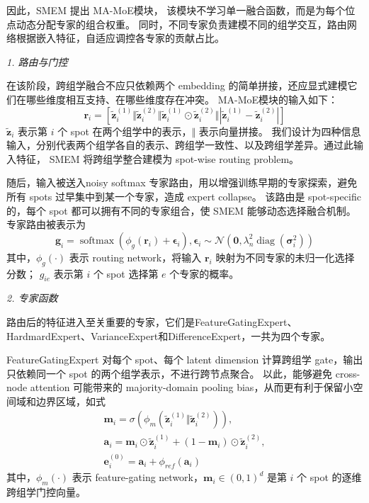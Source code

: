 \documentclass[journal]{IEEEtran}
\begin{document}
因此，SMEM 提出 MA-MoE模块，
该模块不学习单一融合函数，而是为每个位点动态分配专家的组合权重。
同时，不同专家负责建模不同的组学交互，路由网络根据嵌入特征，自适应调控各专家的贡献占比。

\textit{1. 路由与门控}

在该阶段，跨组学融合不应只依赖两个 embedding 的简单拼接，还应显式建模它们在哪些维度相互支持、在哪些维度存在冲突。
MA-MoE模块的输入如下：
\begin{equation}
    \label{gate input}
\mathbf{r}_i=
\left[
\widetilde{\mathbf{z}}_{i}^{(1)}\Vert
\widetilde{\mathbf{z}}_{i}^{(2)}\Vert
\widetilde{\mathbf{z}}_{i}^{(1)}\odot\widetilde{\mathbf{z}}_{i}^{(2)}\Vert
\left|\widetilde{\mathbf{z}}_{i}^{(1)}-\widetilde{\mathbf{z}}_{i}^{(2)}\right|
\right]
\end{equation}
$\widetilde{\mathbf{z}}_{i}$ 表示第 $i$ 个 spot 在两个组学中的表示，$\Vert$ 表示向量拼接。
我们设计为四种信息输入，分别代表两个组学各自的表示、跨组学一致性、以及跨组学差异。通过此输入特征，
SMEM 将跨组学整合建模为 spot-wise routing problem。

随后，输入被送入noisy softmax 专家路由，用以增强训练早期的专家探索，避免所有 spots 过早集中到某一个专家，造成 expert collapse。
该路由是 spot-specific 的，每个 spot 都可以拥有不同的专家组合，使 SMEM 能够动态选择融合机制。专家路由被表示为
\begin{equation}
    \mathbf{g}_i=
\operatorname{softmax}\left(
\phi_g(\mathbf{r}_i)+\boldsymbol{\epsilon}_i
\right),
\boldsymbol{\epsilon}_i\sim\mathcal{N}\left(\mathbf{0},\lambda_n^2\operatorname{diag}(\boldsymbol{\sigma}_i^2)\right)
\end{equation}
其中，$\phi_g(\cdot)$ 表示 routing network，将输入 $\mathbf{r}_i$ 映射为不同专家的未归一化选择分数；
$g_{ie}$ 表示第 $i$ 个 spot 选择第 $e$ 个专家的概率。

\textit{2. 专家函数}

路由后的特征进入至关重要的专家，它们是FeatureGatingExpert、HardmardExpert、VarianceExpert和DifferenceExpert，一共为四个专家。

FeatureGatingExpert 对每个 spot、每个 latent dimension 计算跨组学 gate，输出只依赖同一个 spot 的两个组学表示，不进行跨节点聚合。
以此，能够避免 cross-node attention 可能带来的 majority-domain pooling bias，从而更有利于保留小空间域和边界区域，如式
\begin{equation}
    \begin{aligned}
    \mathbf{m}_i=\sigma\left(\phi_m\left(\widetilde{\mathbf{z}}_{i}^{(1)}\Vert\widetilde{\mathbf{z}}_{i}^{(2)}\right)\right),\\
\mathbf{a}_i=
\mathbf{m}_i\odot\widetilde{\mathbf{z}}_{i}^{(1)}+
(1-\mathbf{m}_i)\odot\widetilde{\mathbf{z}}_{i}^{(2)},\\
\mathbf{e}_{i}^{(0)}=\mathbf{a}_i+\phi_{ref}(\mathbf{a}_i)
        \end{aligned}
\end{equation}
其中，$\phi_m(\cdot)$ 表示 feature-gating network，$\mathbf{m}_i\in(0,1)^d$ 是第 $i$ 个 spot 的逐维跨组学门控向量。
\end{document}
